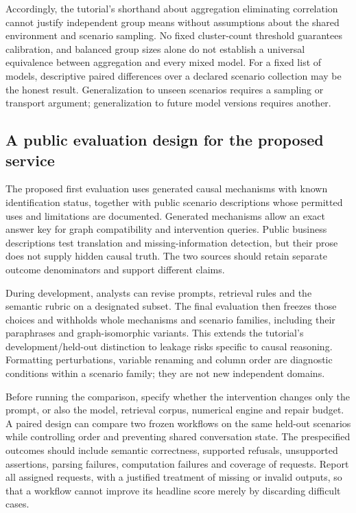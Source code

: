 Accordingly, the tutorial's shorthand about aggregation eliminating correlation
cannot justify independent group means without assumptions about the shared
environment and scenario sampling. No fixed cluster-count threshold guarantees
calibration, and balanced group sizes alone do not establish a universal
equivalence between aggregation and every mixed model. For a fixed list of
models, descriptive paired differences over a declared scenario collection may
be the honest result. Generalization to unseen scenarios requires a sampling or
transport argument; generalization to future model versions requires another.

\subsection{A public evaluation design for the proposed service}
\label{exec20:validity-design}

The proposed first evaluation uses generated causal mechanisms with known
identification status, together with public scenario descriptions whose
permitted uses and limitations are documented. Generated mechanisms allow an
exact answer key for graph compatibility and intervention queries. Public
business descriptions test translation and missing-information detection, but
their prose does not supply hidden causal truth. The two sources should retain
separate outcome denominators and support different claims.

During development, analysts can revise prompts, retrieval rules and the
semantic rubric on a designated subset. The final evaluation then freezes those
choices and withholds whole mechanisms and scenario families, including their
paraphrases and graph-isomorphic variants. This extends the tutorial's
development/held-out distinction to leakage risks specific to causal reasoning.
Formatting perturbations, variable renaming and column order are diagnostic
conditions within a scenario family; they are not new independent domains.
\citep{exec20_validity}

Before running the comparison, specify whether the intervention changes only
the prompt, or also the model, retrieval corpus, numerical engine and repair
budget. A paired design can compare two frozen workflows on the same held-out
scenarios while controlling order and preventing shared conversation state.
The prespecified outcomes should include semantic correctness, supported
refusals, unsupported assertions, parsing failures, computation failures and
coverage of requests. Report all assigned requests, with a justified treatment
of missing or invalid outputs, so that a workflow cannot improve its headline
score merely by discarding difficult cases.

